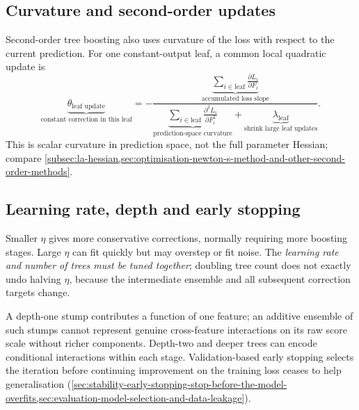 \subsection{Curvature and second-order updates}
\label{subsec:trees-curvature-and-second-order-updates}
Second-order tree boosting also uses curvature of the loss with respect to the current prediction.
For one constant-output leaf, a common local quadratic update is
\begin{equation}
\boxed{
\underbrace{\theta_{\text{leaf update}}}_{\text{constant correction in this leaf}}
=
-\frac{
\underbrace{\sum_{i\in\mathrm{leaf}}\frac{\partial L_i}{\partial F_i}}_{\text{accumulated loss slope}}
}{
\underbrace{\sum_{i\in\mathrm{leaf}}\frac{\partial^2L_i}{\partial F_i^2}}_{\text{prediction-space curvature}}
+
\underbrace{\lambda_{\text{leaf}}}_{\text{shrink large leaf updates}}
}
}.
\end{equation}
This is scalar curvature in prediction space, not the full parameter Hessian; compare \cref{subsec:la-hessian,sec:optimisation-newton-s-method-and-other-second-order-methods}.

\subsection{Learning rate, depth and early stopping}
\label{subsec:trees-learning-rate-depth-and-early-stopping}
Smaller $\eta$ gives more conservative corrections, normally requiring more boosting stages.
Large $\eta$ can fit quickly but may overstep or fit noise.
The \emph{learning rate and number of trees must be tuned together}; doubling tree count does not exactly undo halving $\eta$, because the intermediate ensemble and all subsequent correction targets change.

A depth-one stump contributes a function of one feature; an additive ensemble of such stumps cannot represent genuine cross-feature interactions on its raw score scale without richer components.
Depth-two and deeper trees can encode conditional interactions within each stage.
Validation-based early stopping selects the iteration before continuing improvement on the training loss ceases to help generalisation (\cref{sec:stability-early-stopping-stop-before-the-model-overfits,sec:evaluation-model-selection-and-data-leakage}).

